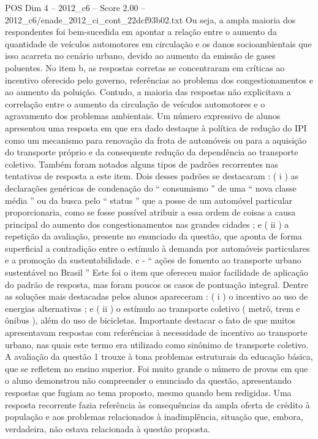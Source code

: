 \begin{textsample}{POS Dim 4 – 2012\_c6 – Score 2.00 – 2012\_c6/enade\_2012\_ci\_cont\_22dcf93b02.txt}
Ou seja, a ampla maioria dos respondentes foi bem-sucedida em apontar a relação entre o aumento da quantidade de veículos automotores em circulação e os danos socioambientais que isso acarreta no cenário urbano, devido ao aumento da emissão de gases poluentes.
No item b, as respostas corretas se concentraram em críticas ao incentivo oferecido pelo governo, referências ao problema dos congestionamentos e ao aumento da poluição.
Contudo, a maioria das respostas não explicitava a correlação entre o aumento da circulação de veículos automotores e o agravamento dos problemas ambientais.
Um número expressivo de alunos apresentou uma resposta em que era dado destaque à política de redução do IPI como um mecanismo para renovação da frota de automóveis ou para a aquisição do transporte próprio e da consequente redução da dependência ao transporte coletivo.
Também foram notados alguns tipos de padrões recorrentes nas tentativas de resposta a este item.
Dois desses padrões se destacaram : ( i ) as declarações genéricas de condenação do “ consumismo ” de uma “ nova classe média ” ou da busca pelo “ status ” que a posse de um automóvel particular proporcionaria, como se fosse possível atribuir a essa ordem de coisas a causa principal do aumento dos congestionamentos nas grandes cidades ; e ( ii ) a repetição da avaliação, presente no enunciado da questão, que aponta de forma superficial a contradição entre o estímulo à demanda por automóveis particulares e a promoção da sustentabilidade. c - “ ações de fomento ao transporte urbano sustentável no Brasil ” Este foi o item que ofereceu maior facilidade de aplicação do padrão de resposta, mas foram poucos os casos de pontuação integral.
Dentre as soluções mais destacadas pelos alunos apareceram : ( i ) o incentivo ao uso de energias alternativas ; e ( ii ) o estímulo ao transporte coletivo ( metrô, trem e ônibus ), além do uso de bicicletas.
Importante destacar o fato de que muitos apresentavam respostas com referências à necessidade de incentivo ao transporte urbano, nas quais este termo era utilizado como sinônimo de transporte coletivo.
A avaliação da questão 1 trouxe à tona problemas estruturais da educação básica, que se refletem no ensino superior.
Foi muito grande o número de provas em que o aluno demonstrou não compreender o enunciado da questão, apresentando respostas que fugiam ao tema proposto, mesmo quando bem redigidas.
Uma resposta recorrente fazia referência às consequências da ampla oferta de crédito à população e aos problemas relacionados à inadimplência, situação que, embora, verdadeira, não estava relacionada à questão proposta.

\end{textsample}
